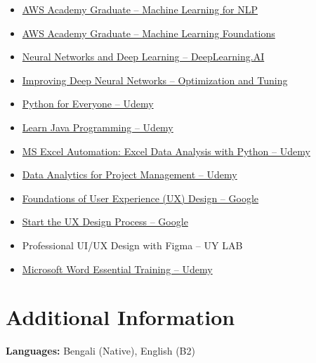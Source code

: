 \documentclass[a4paper,10pt]{article}
\begin{document}
\begin{itemize}

    \item
    \href{https://www.credly.com/go/redrq256}
    {AWS Academy Graduate -- Machine Learning for NLP}

    \item
    \href{https://www.credly.com/go/l5bCc9kc}
    {AWS Academy Graduate -- Machine Learning Foundations}

    \item
    \href{https://coursera.org/verify/PRRMQLF92VWO}
    {Neural Networks and Deep Learning -- DeepLearning.AI}

    \item
    \href{https://coursera.org/verify/VD1JTFF6AWCI}
    {Improving Deep Neural Networks -- Optimization and Tuning}

    \item
    \href{https://udemy.com/certificate/UC-cd60633a-88c6-4aba-a10d-b816e0342bf5}
    {Python for Everyone -- Udemy}

    \item
    \href{https://udemy.com/certificate/UC-50faf0ad-2db0-4e7d-b21d-664479cb1e00}
    {Learn Java Programming -- Udemy}

    \item
    \href{https://udemy.com/certificate/UC-bc8eb25b-78a3-4b87-99aa-cfc5cb70a768}
    {MS Excel Automation: Excel Data Analysis with Python -- Udemy}

    \item
    \href{https://udemy.com/certificate/UC-fce22cf6-3944-42fe-a9ba-00f5184d818b}
    {Data Analytics for Project Management -- Udemy}

    \item
    \href{https://coursera.org/verify/U7A5CRUI7LOB}
    {Foundations of User Experience (UX) Design -- Google}

    \item
    \href{https://coursera.org/verify/YOY3MT6ZIQ01}
    {Start the UX Design Process -- Google}

    \item Professional UI/UX Design with Figma -- UY LAB

    \item
    \href{https://udemy.com/certificate/UC-d26cc973-0299-447c-a773-b4584e918aaf}
    {Microsoft Word Essential Training -- Udemy}

\end{itemize}


\section*{Additional Information}

\textbf{Languages:} Bengali (Native), English (B2)
\end{document}
